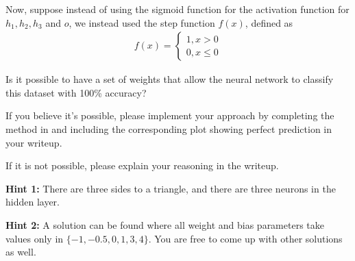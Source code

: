 \item {} Now, suppose instead of using the sigmoid function for the activation function for $h_1, h_2, h_3$ and $o$, we instead used the step function $f(x)$, defined as
\begin{align*}
f(x) = \begin{cases}
    1, x > 0 \\
    0, x \le 0
    \end{cases}
\end{align*}

Is it possible to have a set of weights that allow the neural network to classify this dataset with 100\% accuracy?

If you believe it's possible, please implement your approach by completing the  method in  and including the corresponding   plot showing perfect prediction in your writeup.

If it is not possible, please explain your reasoning in the writeup.

\textbf{Hint 1:} There are three sides to a triangle, and there are three neurons in the hidden layer.

\textbf{Hint 2:} A solution can be found where all weight and bias parameters take values only in $\{-1, -0.5, 0, 1, 3, 4 \}$. You are free to come up with other solutions as well.

